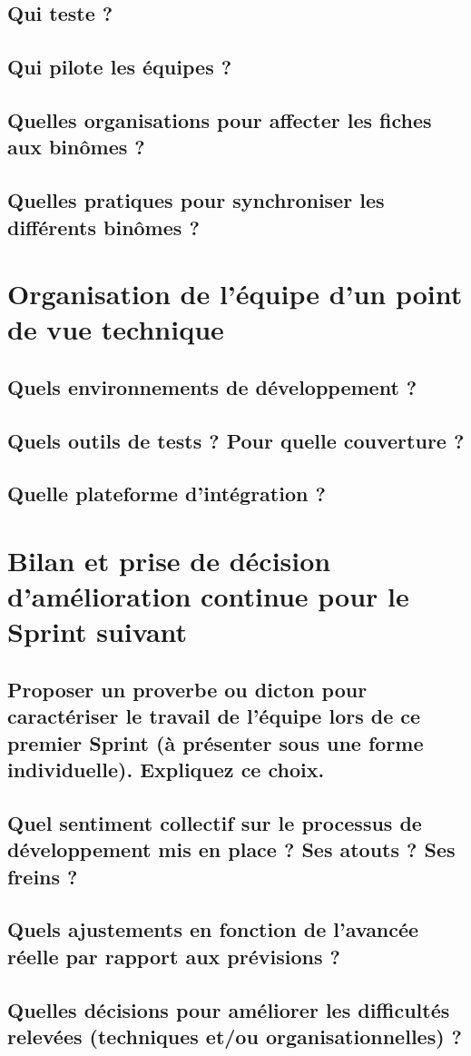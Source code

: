 \documentclass[10pt,a4paper]{article}
\begin{document}
	\subsection{Qui teste ?}
	\subsection{Qui pilote les équipes ?}
	\subsection{Quelles organisations pour affecter les fiches aux binômes ?}
	\subsection{Quelles pratiques pour synchroniser les différents binômes ?}
	
	\section{Organisation de l’équipe d’un point de vue technique}
	\subsection{Quels environnements de développement ?}
	\subsection{Quels outils de tests ? Pour quelle couverture ?}
	\subsection{Quelle plateforme d’intégration ?}
	
	\section{Bilan et prise de décision d’amélioration continue pour le Sprint suivant }
	\subsection{Proposer un proverbe ou dicton pour caractériser le travail de l’équipe lors de ce premier Sprint (à présenter sous une forme individuelle). Expliquez ce choix.}
	\subsection{Quel sentiment collectif sur le processus de développement mis en place ? Ses atouts ? Ses freins ?}
	\subsection{Quels ajustements en fonction de l’avancée réelle par rapport aux prévisions ?}
	\subsection{Quelles décisions pour améliorer les difficultés relevées (techniques et/ou organisationnelles) ?}
	
\end{document}
